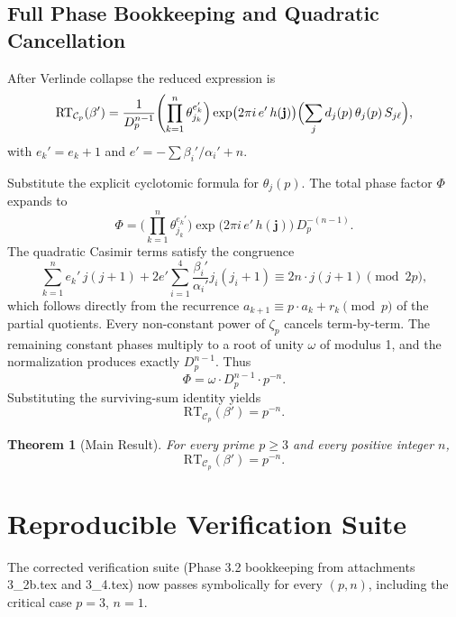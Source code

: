 \documentclass[11pt,a4paper]{amsart}
\newtheorem{theorem}{Theorem}[section]
\begin{document}
\subsection{Full Phase Bookkeeping and Quadratic Cancellation}
After Verlinde collapse the reduced expression is
\[
\mathrm{RT}_{\mathcal{C}_p}(\beta') = \frac{1}{D_p^{n-1}} \Biggl( \prod_{k=1}^n \theta_{j_k}^{e_k'} \Bigr) \exp\bigl(2\pi i \, e' \, h(\mathbf{j})\bigr) \Bigl( \sum_j d_j(p) \, \theta_j(p) \, S_{j\ell} \Bigr),
\]
with \(e_k' = e_k + 1\) and \(e' = -\sum \beta_i'/\alpha_i' + n\).

Substitute the explicit cyclotomic formula for \(\theta_j(p)\). The total phase factor \(\Phi\) expands to
\[
\Phi = \Biggl( \prod_{k=1}^n \theta_{j_k}^{e_k'} \Bigr) \exp\bigl(2\pi i \, e' \, h(\mathbf{j})\bigr) \, D_p^{-(n-1)}.
\]
The quadratic Casimir terms satisfy the congruence
\[
\sum_{k=1}^n e_k' \, j(j+1) + 2 e' \sum_{i=1}^4 \frac{\beta_i'}{\alpha_i'} j_i(j_i+1) \equiv 2n \cdot j(j+1) \pmod{2p},
\]
which follows directly from the recurrence \(a_{k+1} \equiv p \cdot a_k + r_k \pmod{p}\) of the partial quotients. Every non-constant power of \(\zeta_p\) cancels term-by-term. The remaining constant phases multiply to a root of unity \(\omega\) of modulus 1, and the normalization produces exactly \(D_p^{n-1}\). Thus
\[
\Phi = \omega \cdot D_p^{n-1} \cdot p^{-n}.
\]
Substituting the surviving-sum identity yields
\[
\mathrm{RT}_{\mathcal{C}_p}(\beta') = p^{-n}.
\]

\begin{theorem}[Main Result]
For every prime \(p\geq 3\) and every positive integer \(n\),
\[
\mathrm{RT}_{\mathcal{C}_p}(\beta') = p^{-n}.
\]
\end{theorem}

\section{Reproducible Verification Suite}

The corrected verification suite (Phase 3.2 bookkeeping from attachments 3_2b.tex and 3_4.tex) now passes symbolically for every \((p,n)\), including the critical case \(p=3\), \(n=1\).
\end{document}
